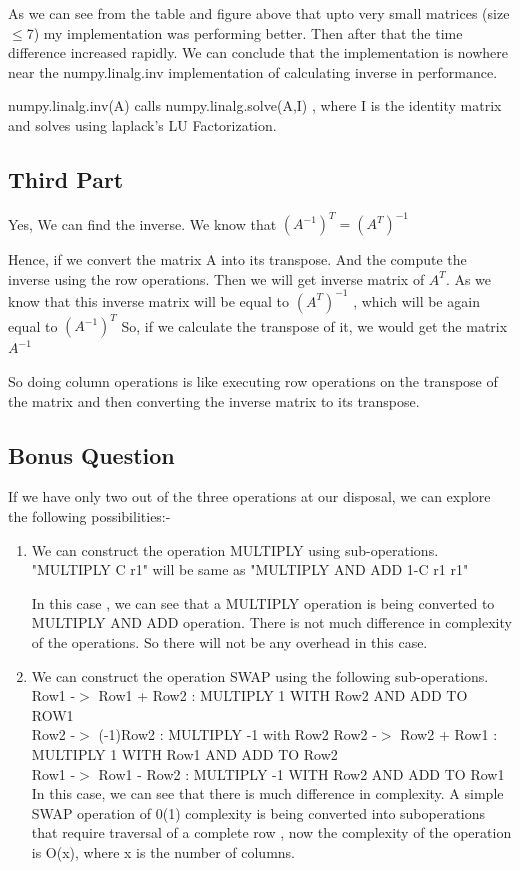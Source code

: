 \documentclass[runningheads]{llncs}
\begin{document}
As we can see from the table and figure above that upto very small matrices (size $\leq$7) my implementation was performing better. Then after that the time difference increased rapidly. We can conclude that the implementation is nowhere near the numpy.linalg.inv implementation of calculating inverse in performance. 

numpy.linalg.inv(A) calls numpy.linalg.solve(A,I) , where I is the identity matrix and solves using laplack's LU Factorization.~\cite{ref_proc1}

\subsection{Third Part}
Yes, We can find the inverse. We know that $(A^{-1})^T = (A^T)^{-1}$ 

Hence, if we convert the matrix A into its transpose. And the compute the inverse using the row operations. Then we will get inverse matrix of $A^T$.
As we know that this inverse matrix will be equal to $(A^{T})^{-1}$ , which will be again equal to $(A^{-1})^T$
So, if we calculate the transpose of it, we would get the matrix $A^{-1}$

So doing column operations is like executing row operations on the transpose of the matrix and then converting the inverse matrix to its transpose. 


\subsection{Bonus Question}
If we have only two out of the three operations at our disposal, we can explore the following possibilities:-
\begin{enumerate}
\item
We can construct the operation MULTIPLY using sub-operations.\\
"MULTIPLY C r1" will be same as "MULTIPLY AND ADD 1-C r1 r1"

In this case , we can see that a MULTIPLY operation is being converted to MULTIPLY AND ADD operation. There is not much difference in complexity of the operations. So there will not be any overhead in this case. 

\item
We can construct the operation SWAP using the following sub-operations.\\
Row1 -$>$ Row1 + Row2 : MULTIPLY 1 WITH Row2 AND ADD TO ROW1\\
Row2 -$>$ (-1)Row2 : MULTIPLY -1 with Row2
Row2 -$>$ Row2 + Row1 : MULTIPLY 1 WITH Row1 AND ADD TO Row2\\
Row1 -$>$ Row1 - Row2 : MULTIPLY -1 WITH Row2 AND ADD TO Row1\\

In this case, we can see that there is much difference in complexity. A simple SWAP operation of 0(1) complexity is being converted into suboperations that require traversal of a complete row , now the complexity of the operation is O(x), where x is the number of columns. 

\end{enumerate}
\end{document}
